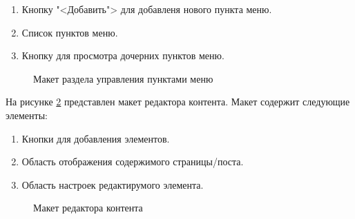\begin{enumerate}
	\item Кнопку "<Добавить"> для добавленя нового пункта меню.
	\item Список пунктов меню.
	\item Кнопку для просмотра дочерних пунктов меню.
\end{enumerate}
\begin{figure}[H]
	\center{\texttt{[image: ui4]}}
	\caption{Макет раздела управления пунктами меню}
	\label{ui4:image}
\end{figure}
На рисунке \ref{ui5:image} представлен макет редактора контента. Макет содержит следующие элементы:
\begin{enumerate}
	\item Кнопки для добавления элементов.
	\item Область отображения содержимого страницы/поста.
	\item Область настроек редактирумого элемента.
\end{enumerate}
\begin{figure}[H]
	\center{\texttt{[image: ui5]}}
	\caption{Макет редактора контента}
	\label{ui5:image}
\end{figure}
